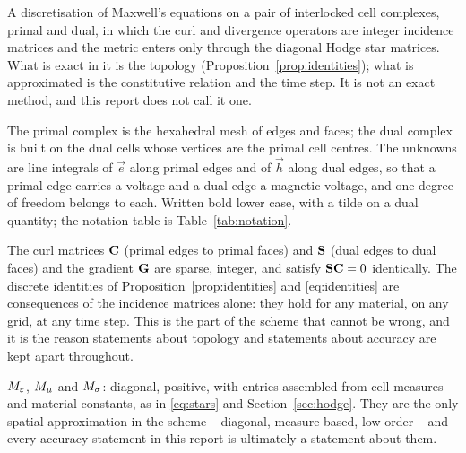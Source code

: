 \begin{description}[leftmargin=1.6em,style=nextline,itemsep=4pt]

  \item[Finite integration technique (FIT).]
        A discretisation of Maxwell's equations on a pair of interlocked cell complexes, primal and dual, in which
        the curl and divergence operators are integer incidence matrices and the metric enters only through the
        diagonal Hodge star matrices. What is exact in it is the topology (Proposition~\ref{prop:identities}); what
        is approximated is the constitutive relation and the time step. It is not an exact method, and this report
        does not call it one.

  \item[Primal and dual complex; degrees of freedom.]
        The primal complex is the hexahedral mesh of edges and faces; the dual complex is built on the dual cells
        whose vertices are the primal cell centres. The unknowns are line integrals of $\vec e$ along primal edges
        and of $\vec h$ along dual edges, so that a primal edge carries a voltage and a dual edge a magnetic
        voltage, and one degree of freedom belongs to each. Written bold lower case, with a tilde on a dual
        quantity; the notation table is Table~\ref{tab:notation}.

  \item[Topological operators and the exact identities.]
        The curl matrices $\mathbf{C}$ (primal edges to primal faces) and $\mathbf{S}$ (dual edges to dual faces) and the
        gradient $\mathbf{G}$ are sparse, integer, and satisfy $\mathbf{S}\mathbf{C}=0$ identically. The discrete identities of
        Proposition~\ref{prop:identities} and \eqref{eq:identities} are consequences of the incidence matrices
        alone: they hold for any material, on any grid, at any time step. This is the part of the scheme that
        cannot be wrong, and it is the reason statements about topology and statements about accuracy are kept
        apart throughout.

  \item[Hodge star matrices.]
        ${M_{\varepsilon}}$, ${M_{\mu}}$ and ${M_{\sigma}}$: diagonal, positive, with entries assembled from cell measures and material
        constants, as in \eqref{eq:stars} and Section~\ref{sec:hodge}. They are the only spatial approximation in
        the scheme -- diagonal, measure-based, low order -- and every accuracy statement in this report is
        ultimately a statement about them.


\end{description}
